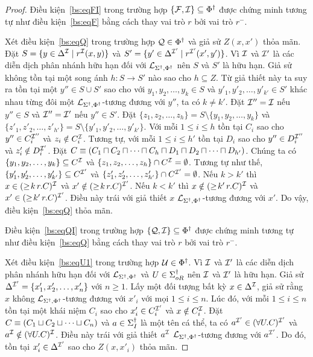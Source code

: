 \begin{proof}
	\semiItem Điều kiện~\eqref{bs:eqFI} trong trường hợp $\{\mathcal{F},\mathcal{I}\} \subseteq \Phi^\dag$ được chứng minh tương tự như điều kiện~\eqref{bs:eqF} bằng cách thay vai trò $r$ bởi vai trò $r^-$.
	
	\semiItem Xét điều kiện~\eqref{bs:eqQ} trong trường hợp $\mathcal{Q} \in \Phi^\dag$ và giả sử $Z(x,x')$ thỏa mãn. Đặt $S = \{y \in \Delta^{\mathcal{I}} \mid r^{\mathcal{I}}(x,y)\}$ và $S' = \{y' \in \Delta^{\mathcal{I}'} \mid r^{\mathcal{I}'}(x',y')\}$. Vì $\mathcal{I}$ và $\mathcal{I}'$ là các diễn dịch phân nhánh hữu hạn đối với $\mathcal{L}_{\Sigma^\dag,\Phi^\dag}$ nên $S$ và $S'$ là hữu hạn. 
	Giả sử không tồn tại một song ánh $h : S \rightarrow S'$ nào sao cho $h \subseteq Z$. Từ giả thiết này ta suy ra tồn tại một $y'' \in S \cup S'$ sao cho với $y_1, y_2, \ldots, y_k \in S$ và $y'_1, y'_2, \ldots, y'_{k'} \in S'$ khác nhau từng đôi một $\mathcal{L}_{\Sigma^\dag,\Phi^\dag}$-tương đương với $y''$, ta có $k \not= k'$. Đặt $\mathcal{I}'' = \mathcal{I}$ nếu $y'' \in S$ và $\mathcal{I}'' = \mathcal{I}'$ nếu $y'' \in S'$. Đặt $\{z_1, z_2, \ldots, z_h\} = S \setminus \{y_1, y_2, \ldots, y_k\}$ và $\{z'_1, z'_2, \ldots, z'_{h'}\} = S \setminus \{y'_1, y'_2, \ldots, y'_{k'}\}$. Với mỗi $1 \leq i \leq h$ tồn tại $C_i$ sao cho $y'' \in C_i^{\mathcal{I}''}$ và $z_i \notin C_i^{\mathcal{I}}$. Tương tự, với mỗi $1 \leq i \leq h'$ tồn tại $D_i$ sao cho $y'' \in D_i^{\mathcal{I}''}$ và $z'_i \notin D_i^{\mathcal{I}'}$. Đặt $C \equiv (C_1 \sqcap C_2 \sqcap \cdots \sqcap C_h \sqcap D_1 \sqcap D_2 \sqcap \cdots \sqcap D_{h'})$. Chúng ta có $\{y_1, y_2, \ldots, y_k\} \subseteq C^{\mathcal{I}}$ và $\{z_1, z_2, \ldots, z_h\} \cap C^{\mathcal{I}} = \emptyset$. Tương tự như thế, $\{y'_1, y'_2, \ldots, y'_{k'}\} \subseteq C^{\mathcal{I}'}$ và $\{z'_1, z'_2, \ldots, z'_{h'}\} \cap C^{\mathcal{I}'} = \emptyset$. Nếu $k > k'$ thì $x \in (\geq\!k\,r.C)^{\mathcal{I}}$ và $x' \notin (\geq\!k\,r.C)^{\mathcal{I}'}$. Nếu $k < k'$ thì $x \notin (\geq\!k'\,r.C)^{\mathcal{I}}$ và $x' \in (\geq\!k'\,r.C)^{\mathcal{I}'}$. Điều này trái với giả thiết $x$ $\mathcal{L}_{\Sigma^\dag,\Phi^\dag}$-tương đương với $x'$. Do vậy, điều kiện~\eqref{bs:eqQ} thỏa mãn.
	
	\semiItem Điều kiện~\eqref{bs:eqQI} trong trường hợp $\{\mathcal{Q},\mathcal{I}\} \subseteq \Phi^\dag$ được chứng minh tương tự như điều kiện~\eqref{bs:eqQ} bằng cách thay vai trò $r$ bởi vai trò $r^-$.
	
	\semiItem Xét điều kiện~\eqref{bs:eqU1} trong trường hợp $\mathcal{U} \in \Phi^\dag$. Vì $\mathcal{I}$ và $\mathcal{I}'$ là các diễn dịch phân nhánh hữu hạn đối với $\mathcal{L}_{\Sigma^\dag,\Phi^\dag}$ và $U \in \Sigma^\dag_{oR}$ nên $\mathcal{I}$ và $\mathcal{I}'$ là hữu hạn. Giả sử $\Delta^{\mathcal{I}'} = \{x'_1, x'_2, \ldots, x'_n\}$ với $n \geq 1$. Lấy một đối tượng bất kỳ $x \in \Delta^{\mathcal{I}}$, giả sử rằng $x$ không $\mathcal{L}_{\Sigma^\dag,\Phi^\dag}$-tương đương với $x'_i$ với mọi $1 \leq i \leq n$. Lúc đó, với mỗi $1 \leq i \leq n$ tồn tại một khái niệm $C_i$ sao cho $x'_i \in C_i^{\mathcal{I}'}$ và $x \notin C_i^{\mathcal{I}}$. Đặt $C \equiv (C_1 \sqcup C_2 \sqcup \cdots \sqcup C_n)$ và $a \in \Sigma^\dag_I$ là một tên cá thể, ta có $a^{\mathcal{I}'} \in (\forall U.C)^{\mathcal{I}'}$ và $a^{\mathcal{I}} \notin (\forall U.C)^{\mathcal{I}}$. Điều này trái với giả thiết $a^{\mathcal{I}}$ $\mathcal{L}_{\Sigma^\dag,\Phi^\dag}$-tương đương với $a^{\mathcal{I}'}$. Do đó, tồn tại $x'_i \in \Delta^{\mathcal{I}'}$ sao cho $Z(x, x'_i)$ thỏa mãn.
	

\end{proof}
